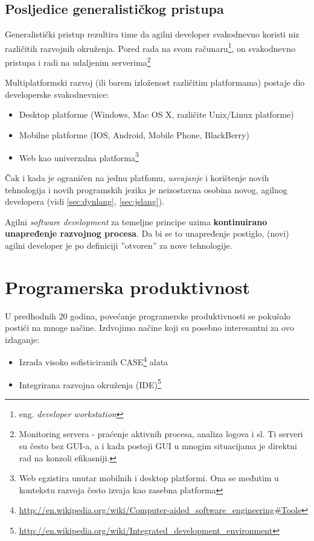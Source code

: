 \documentclass[times, utf8, seminar]{fit}
\begin{document}
\subsection{Posljedice generalističkog pristupa}

Generalistički pristup rezultira time da agilni developer svakodnevno koristi niz različitih razvojnih okruženja. Pored rada na svom računaru\footnote{eng. \emph{developer workstation}}, on svakodnevno pristupa i radi na udaljenim serverima\footnote{Monitoring servera - praćenje aktivnih procesa, analiza logova i sl. Ti serveri su često bez GUI-a, a i kada postoji GUI u mnogim situacijama je direktni rad na konzoli efikasniji.}

Multiplatformski razvoj (ili barem izloženost različitim platformama) postaje dio developerske svakodnevnice:
\begin{itemize}
    \item Desktop platforme (Windows, Mac OS X, različite Unix/Linux platforme) 
    \item Mobilne platforme (IOS, Android, Mobile Phone, BlackBerry)
    \item Web kao univerzalna platforma\footnote{Web egzistira unutar mobilnih i desktop platformi. Ona se međutim u kontekstu razvoja često izvaja kao zasebna platforma}
\end{itemize}

Čak i kada je ograničen na jednu platfomu, \emph{usvajanje} i korištenje novih tehnologija i novih programskih jezika je neizostavna osobina novog, agilnog developera (vidi \ref{sec:dynlang}, \ref{sec:jslang}).

Agilni \emph{software development} za temeljne principe uzima \textbf{kontinuirano unapređenje razvojnog procesa}. Da bi se to unapređenje postiglo, (novi) agilni developer je po definiciji ''otvoren'' za nove tehnologije.

\section{Programerska produktivnost}

U predhodnih 20 godina, povećanje programerske produktivnosti se pokušalo postići na mnoge načine. Izdvojimo načine koji su posebno interesantni za ovo izlaganje:

\begin{itemize}
  \item Izrada visoko sofisticiranih CASE\footnote{\url{http://en.wikipedia.org/wiki/Computer-aided_software_engineering#Tools}} alata
  \item Integrirana razvojna okruženja (IDE)\footnote{\url{http://en.wikipedia.org/wiki/Integrated_development_environment}} 
\end{itemize}
\end{document}
